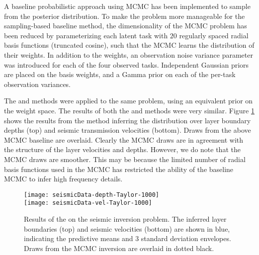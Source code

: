 
A baseline probabilistic approach using MCMC has been implemented to sample
from the posterior distribution. To make the problem more manageable for the
sampling-based baseline method, the dimensionality of the MCMC problem has been
reduced by parameterizing each latent task with $20$ regularly spaced radial
basis functions (truncated cosine), such that the MCMC learns the distribution
of their weights. In addition to the weights, an observation noise variance
parameter was introduced for each of the four observed tasks. Independent
Gaussian priors are placed on the basis weights, and a Gamma prior on each of
the per-task observation variances.

The \eks and \uks methods were applied to the same problem, using an equivalent 
prior on the weight space.
The results of both the \eks and \uks methods were very similar. Figure 
\ref{fig:seismic_result} shows the results from the \eks method inferring the 
distribution over layer boundary depths (top) and seismic transmission 
velocities (bottom). Draws from the above MCMC baseline are overlaid. Clearly
the MCMC draws are in agreement with the structure of the layer velocities and 
depths. However, we do note that the MCMC draws are smoother. This may be 
because the limited number of radial basis functions used in the MCMC has 
restricted the ability of the baseline MCMC to infer high frequency details.

\begin{figure}[htb]
\texttt{[image: seismicData-depth-Taylor-1000]} \\
\texttt{[image: seismicData-vel-Taylor-1000]}
\caption{Results of the \eks on the seismic inversion problem. The inferred 
    layer boundaries (top) and seismic velocities (bottom) are shown in blue, 
    indicating the predictive means and 3 standard deviation envelopes. Draws
    from the MCMC inversion are overlaid in dotted black.}
 \label{fig:seismic_result}
\end{figure}

